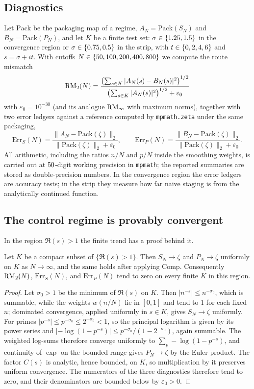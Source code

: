 \subsection{Diagnostics}
Let $\mathrm{Pack}$ be the packaging map of a regime, $A_N=\mathrm{Pack}(S_N)$ and $B_N=\mathrm{Pack}(P_N)$, and let $K$ be a finite test set: $\sigma\in\{1.25,1.5\}$ in the convergence region or $\sigma\in\{0.75,0.5\}$ in the strip, with $t\in\{0,2,4,6\}$ and $s=\sigma+it$.
With cutoffs $N\in\{50,100,200,400,800\}$ we compute the route mismatch
\[
  \mathrm{RM}_2(N)=\frac{\bigl(\sum_{s\in K}|A_N(s)-B_N(s)|^2\bigr)^{1/2}}{\bigl(\sum_{s\in K}|A_N(s)|^2\bigr)^{1/2}+\varepsilon_0}
\]
with $\varepsilon_0=10^{-30}$ (and its analogue $\mathrm{RM}_\infty$ with maximum norms), together with two error ledgers against a reference computed by \texttt{mpmath.zeta} under the same packaging,
\[
  \mathrm{Err}_S(N)=\frac{\|A_N-\mathrm{Pack}(\zeta)\|_2}{\|\mathrm{Pack}(\zeta)\|_2+\varepsilon_0},\qquad
  \mathrm{Err}_P(N)=\frac{\|B_N-\mathrm{Pack}(\zeta)\|_2}{\|\mathrm{Pack}(\zeta)\|_2+\varepsilon_0}.
\]
All arithmetic, including the ratios $n/N$ and $p/N$ inside the smoothing weights, is carried out at $50$-digit working precision in \texttt{mpmath}; the reported summaries are stored as double-precision numbers.
In the convergence region the error ledgers are accuracy tests; in the strip they measure how far naive staging is from the analytically continued function.

\subsection{The control regime is provably convergent}
In the region $\Re(s)>1$ the finite trend has a proof behind it.

\begin{proposition}\label{prop:prime-control}
Let $K$ be a compact subset of $\{\Re(s)>1\}$. Then $S_N\to\zeta$ and $P_N\to\zeta$ uniformly on $K$ as $N\to\infty$, and the same holds after applying $\mathrm{Comp}$. Consequently $\mathrm{RM}_2(N)$, $\mathrm{Err}_S(N)$, and $\mathrm{Err}_P(N)$ tend to zero on every finite $K$ in this region.
\end{proposition}

\begin{proof}
Let $\sigma_0>1$ be the minimum of $\Re(s)$ on $K$. Then $|n^{-s}|\le n^{-\sigma_0}$, which is summable, while the weights $w(n/N)$ lie in $[0,1]$ and tend to $1$ for each fixed $n$; dominated convergence, applied uniformly in $s\in K$, gives $S_N\to\zeta$ uniformly. For primes $|p^{-s}|\le p^{-\sigma_0}\le 2^{-\sigma_0}<1$, so the principal logarithm is given by its power series and $|{-\log(1-p^{-s})}|\le p^{-\sigma_0}/(1-2^{-\sigma_0})$, again summable. The weighted log-sums therefore converge uniformly to $\sum_p-\log(1-p^{-s})$, and continuity of $\exp$ on the bounded range gives $P_N\to\zeta$ by the Euler product. The factor $C(s)$ is analytic, hence bounded, on $K$, so multiplication by it preserves uniform convergence. The numerators of the three diagnostics therefore tend to zero, and their denominators are bounded below by $\varepsilon_0>0$.
\end{proof}

